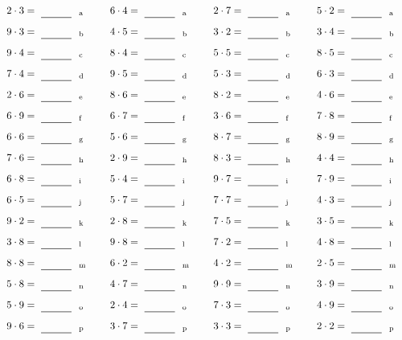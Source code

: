 \documentclass
[
  draft    = true,
  fontsize = 11pt,
  parskip  = half-
]
{scrartcl}
\begin{document}
\par\vfill\par
\begin{align*}
    \pline{2\cdot3}&=\rline{a}
  & \pline{6\cdot4}&=\rline{a}
  & \pline{2\cdot7}&=\rline{a}
  & \pline{5\cdot2}&=\rline{a} \\[1ex]
    \pline{9\cdot3}&=\rline{b}
  & \pline{4\cdot5}&=\rline{b}
  & \pline{3\cdot2}&=\rline{b}
  & \pline{3\cdot4}&=\rline{b} \\[1ex]
    \pline{9\cdot4}&=\rline{c}
  & \pline{8\cdot4}&=\rline{c}
  & \pline{5\cdot5}&=\rline{c}
  & \pline{8\cdot5}&=\rline{c} \\[1ex]
    \pline{7\cdot4}&=\rline{d}
  & \pline{9\cdot5}&=\rline{d}
  & \pline{5\cdot3}&=\rline{d}
  & \pline{6\cdot3}&=\rline{d} \\[1ex]
    \pline{2\cdot6}&=\rline{e}
  & \pline{8\cdot6}&=\rline{e}
  & \pline{8\cdot2}&=\rline{e}
  & \pline{4\cdot6}&=\rline{e} \\[1ex]
    \pline{6\cdot9}&=\rline{f}
  & \pline{6\cdot7}&=\rline{f}
  & \pline{3\cdot6}&=\rline{f}
  & \pline{7\cdot8}&=\rline{f} \\[1ex]
    \pline{6\cdot6}&=\rline{g}
  & \pline{5\cdot6}&=\rline{g}
  & \pline{8\cdot7}&=\rline{g}
  & \pline{8\cdot9}&=\rline{g} \\[1ex]
    \pline{7\cdot6}&=\rline{h}
  & \pline{2\cdot9}&=\rline{h}
  & \pline{8\cdot3}&=\rline{h}
  & \pline{4\cdot4}&=\rline{h} \\[1ex]
    \pline{6\cdot8}&=\rline{i}
  & \pline{5\cdot4}&=\rline{i}
  & \pline{9\cdot7}&=\rline{i}
  & \pline{7\cdot9}&=\rline{i} \\[1ex]
    \pline{6\cdot5}&=\rline{j}
  & \pline{5\cdot7}&=\rline{j}
  & \pline{7\cdot7}&=\rline{j}
  & \pline{4\cdot3}&=\rline{j} \\[1ex]
    \pline{9\cdot2}&=\rline{k}
  & \pline{2\cdot8}&=\rline{k}
  & \pline{7\cdot5}&=\rline{k}
  & \pline{3\cdot5}&=\rline{k} \\[1ex]
    \pline{3\cdot8}&=\rline{l}
  & \pline{9\cdot8}&=\rline{l}
  & \pline{7\cdot2}&=\rline{l}
  & \pline{4\cdot8}&=\rline{l} \\[1ex]
    \pline{8\cdot8}&=\rline{m}
  & \pline{6\cdot2}&=\rline{m}
  & \pline{4\cdot2}&=\rline{m}
  & \pline{2\cdot5}&=\rline{m} \\[1ex]
    \pline{5\cdot8}&=\rline{n}
  & \pline{4\cdot7}&=\rline{n}
  & \pline{9\cdot9}&=\rline{n}
  & \pline{3\cdot9}&=\rline{n} \\[1ex]
    \pline{5\cdot9}&=\rline{o}
  & \pline{2\cdot4}&=\rline{o}
  & \pline{7\cdot3}&=\rline{o}
  & \pline{4\cdot9}&=\rline{o} \\[1ex]
    \pline{9\cdot6}&=\rline{p}
  & \pline{3\cdot7}&=\rline{p}
  & \pline{3\cdot3}&=\rline{p}
  & \pline{2\cdot2}&=\rline{p}
\end{align*}
\end{document}

